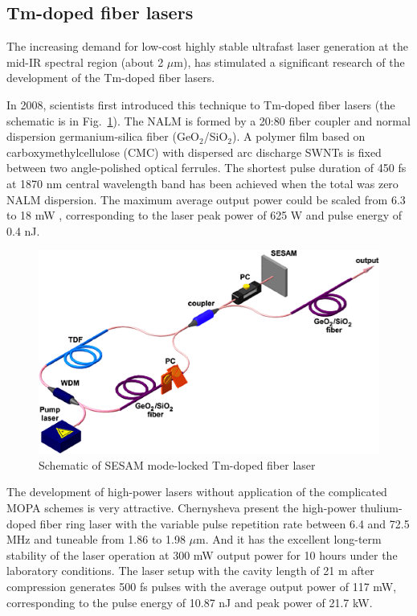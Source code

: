 \documentclass{phyasgn}\usepackage{nag}
\newcommand{\figref}[1]{Fig.~\ref{#1}}
\begin{document}
\subsection{Tm-doped fiber lasers}
The increasing demand for low-cost highly stable ultrafast laser generation at the mid-IR spectral region (about 2 $\mu$m), has stimulated a significant research of the development of the Tm-doped fiber lasers. 
\par In 2008, scientists first introduced this technique to Tm-doped fiber lasers\cite{solodyankin2008mode} (the schematic is in \figref{15}). The NALM is formed by a 20:80 fiber coupler and normal dispersion germanium-silica fiber (GeO$_2$/SiO$_2$). A polymer film based on carboxymethylcellulose (CMC) with dispersed arc discharge SWNTs is fixed between two angle-polished optical ferrules. The shortest pulse duration of 450 fs at 1870 nm central wavelength band has been achieved when the total was zero NALM dispersion. The maximum average output power could be scaled from 6.3 to 18 mW , corresponding to the laser peak power of 625 W and pulse energy of 0.4 nJ.
\begin{figure}[!h]
	\centering
	\includegraphics[width=.85\linewidth]{pic/15.png}
	\caption[Band structures]{Schematic of SESAM mode-locked Tm-doped fiber laser\cite{chernysheva2014sesam}}
	\label{15}
	\end{figure}
\par The development of high-power lasers without application of the complicated MOPA schemes is very attractive. Chernysheva\cite{chernysheva2014higher} present the high-power thulium-doped fiber ring laser with the variable pulse repetition rate between 6.4 and 72.5 MHz and tuneable from 1.86 to 1.98 $\mu$m\cite{chernysheva2014higher}. And it has the excellent long-term stability of the laser operation at 300 mW output power for 10 hours under the laboratory conditions. The laser setup with the cavity length of 21 m after compression generates 500 fs pulses with the average output power of 117 mW, corresponding to the pulse energy of 10.87 nJ and peak power of 21.7 kW\cite{chernysheva2014higher}.
\end{document}
